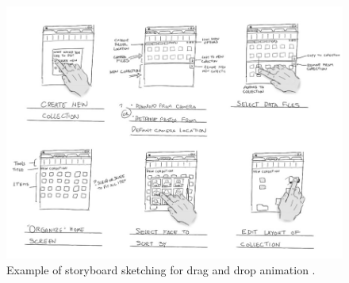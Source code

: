 \begin{figure}[tp]
\centering
\includegraphics[keepaspectratio,width=\hsize,height=\halfh]
{images/storyboard.jpeg}

\caption[Storyboard Sketching]{
Example of storyboard sketching for drag and drop animation \citep{microsoftStoryboard}.
}
\label{fig:storyboard}
\end{figure}
